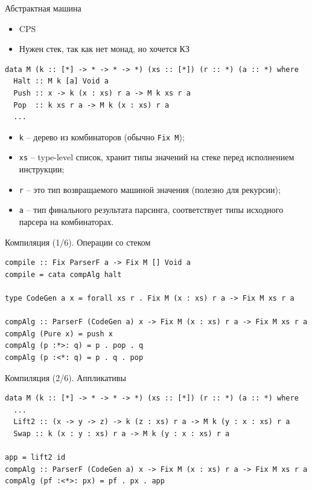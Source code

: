 \begin{frame}[fragile]{Абстрактная машина}
\begin{itemize}
\item CPS 
\item Нужен стек, так как нет монад, но хочется КЗ
\end{itemize}
\newln

\begin{verbatim}
data M (k :: [*] -> * -> * -> *) (xs :: [*]) (r :: *) (a :: *) where
  Halt :: M k [a] Void a
  Push :: x -> k (x : xs) r a -> M k xs r a
  Pop  :: k xs r a -> M k (x : xs) r a
  ...
\end{verbatim}

\begin{itemize}
\item \texttt{k} -- дерево из комбинаторов (обычно \texttt{Fix M});
\item \texttt{xs} --  type-level список, хранит типы значений на стеке перед исполнением инструкции;
\item \texttt{r} -- это тип возвращаемого машиной значения (полезно для рекурсии);
\item \texttt{a} -- тип финального результата парсинга, соответствует типы исходного парсера на комбинаторах.

\end{itemize}
\end{frame}


\begin{frame}[fragile]{Компиляция (1/6). Операции со стеком}
\begin{verbatim}
compile :: Fix ParserF a -> Fix M [] Void a
compile = cata compAlg halt

type CodeGen a x = forall xs r . Fix M (x : xs) r a -> Fix M xs r a

compAlg :: ParserF (CodeGen a) x -> Fix M (x : xs) r a -> Fix M xs r a
compAlg (Pure x) = push x
compAlg (p :*>: q) = p . pop . q
compAlg (p :<*: q) = p . q . pop
\end{verbatim}
\end{frame}

\begin{frame}[fragile]{Компиляция (2/6). Аппликативы}
\begin{verbatim}
data M (k :: [*] -> * -> * -> *) (xs :: [*]) (r :: *) (a :: *) where
  ...
  Lift2 :: (x -> y -> z) -> k (z : xs) r a -> M k (y : x : xs) r a
  Swap :: k (x : y : xs) r a -> M k (y : x : xs) r a
  
app = lift2 id
compAlg :: ParserF (CodeGen a) x -> Fix M (x : xs) r a -> Fix M xs r a
compAlg (pf :<*>: px) = pf . px . app

\end{verbatim}
\end{frame}

